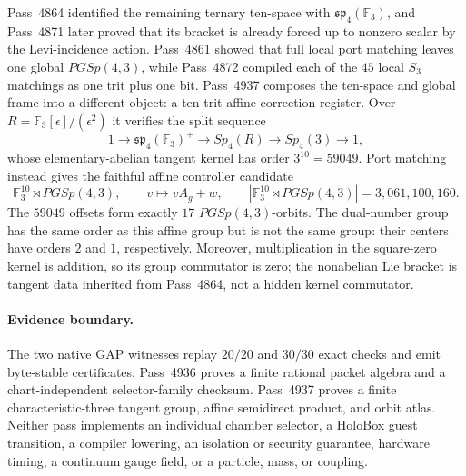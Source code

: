 Pass~4864 identified the remaining ternary ten-space with
$\mathfrak{sp}_4(\mathbb F_3)$, and Pass~4871 later proved that its bracket is
already forced up to nonzero scalar by the Levi-incidence action.  Pass~4861
showed that full local port matching leaves one global $PGSp(4,3)$, while
Pass~4872 compiled each of the $45$ local $S_3$ matchings as one trit plus one
bit.  Pass~4937 composes the ten-space and global frame into a different
object: a ten-trit affine correction register.  Over
$R=\mathbb F_3[\epsilon]/(\epsilon^2)$ it verifies the split
sequence
\[
 1\longrightarrow\mathfrak{sp}_4(\mathbb F_3)^+
 \longrightarrow Sp_4(R)\longrightarrow Sp_4(3)\longrightarrow1,
\]
whose elementary-abelian tangent kernel has order $3^{10}=59049$.  Port
matching instead gives the faithful affine controller candidate
\[
 \mathbb F_3^{10}\rtimes PGSp(4,3),\qquad
 v\longmapsto vA_g+w,\qquad
 |\mathbb F_3^{10}\rtimes PGSp(4,3)|=3{,}061{,}100{,}160.
\]
The $59049$ offsets form exactly $17$ $PGSp(4,3)$-orbits.  The dual-number
group has the same order as this affine group but is not the same group: their
centers have orders $2$ and $1$, respectively.  Moreover, multiplication in
the square-zero kernel is addition, so its group commutator is zero; the
nonabelian Lie bracket is tangent data inherited from Pass~4864, not a hidden
kernel commutator.

\paragraph{Evidence boundary.}
The two native GAP witnesses replay $20/20$ and $30/30$ exact checks and emit
byte-stable certificates.  Pass~4936 proves a finite rational packet algebra
and a chart-independent selector-family checksum.  Pass~4937 proves a finite
characteristic-three tangent group, affine semidirect product, and orbit
atlas.  Neither pass implements an individual chamber selector, a HoloBox
guest transition, a compiler lowering, an isolation or security guarantee,
hardware timing, a continuum gauge field, or a particle, mass, or coupling.
